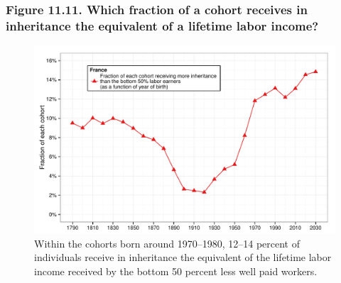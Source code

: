 \documentclass[t]{beamer}\usepackage[]{graphicx}\usepackage[]{color}
\newenvironment{knitrout}{}{} %
\begin{document}
\begin{frame}[label=Figure_11_11]
\frametitle{Figure 11.11. Which fraction of a cohort receives in inheritance the equivalent of a lifetime labor income?}
\begin{figure}[t]
\begin{minipage}[b]{\textwidth}
\centering
\begin{knitrout}\footnotesize
{}\color{fgcolor}

{\centering \includegraphics[width=1\linewidth]{figures/color/Figure_11_11} 

}



\end{knitrout}
\caption{Within the cohorts born around 1970--1980, 12--14 percent of individuals receive in inheritance the equivalent of the lifetime labor income received by the bottom 50 percent less well paid workers.}
\end{minipage}
\end{figure}
\end{frame}
\end{document}
